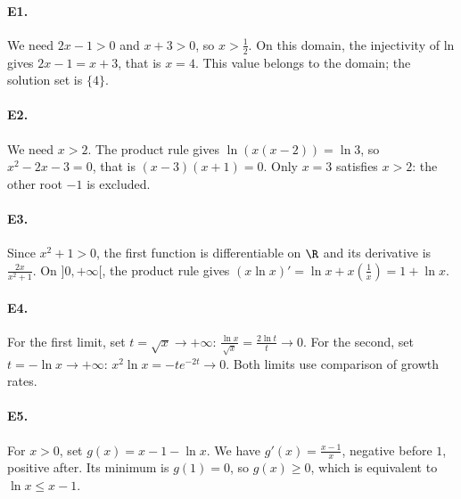 \paragraph{E1.}We need $2x-1>0$ and $x+3>0$, so $x>\frac{1}{2}$. On this domain, the injectivity of ln gives $2x-1=x+3$, that is $x=4$. This value belongs to the domain; the solution set is $\{4\}$.

\paragraph{E2.}We need $x>2$. The product rule gives $\ln(x(x-2))=\ln3$, so $x^2-2x-3=0$, that is $(x-3)(x+1)=0$. Only $x=3$ satisfies $x>2$: the other root $-1$ is excluded.

\paragraph{E3.}Since $x^2+1>0$, the first function is differentiable on $\R$ and its derivative is $\frac{2x}{x^2+1}$. On $]0,+\infty[$, the product rule gives $(x\ln x)'=\ln x+x(\frac{1}{x})=1+\ln x$.

\paragraph{E4.}For the first limit, set $t=\sqrt x\to+\infty$: $\frac{\ln x}{\sqrt{x}}=\frac{2\ln t}{t}\to0$. For the second, set $t=-\ln x\to+\infty$: $x^2\ln x=-te^{-2t}\to0$. Both limits use comparison of growth rates.

\paragraph{E5.}For $x>0$, set $g(x)=x-1-\ln x$. We have $g'(x)=\frac{x-1}{x}$, negative before $1$, positive after. Its minimum is $g(1)=0$, so $g(x)\ge0$, which is equivalent to $\ln x\le x-1$.

